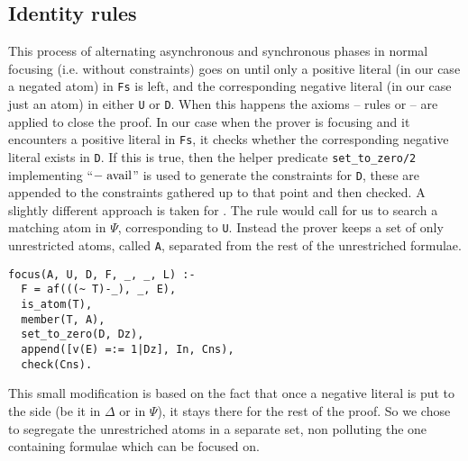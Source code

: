 \subsection{Identity rules}\label{sec:identity}
This process of alternating asynchronous and synchronous phases in normal focusing (i.e. without constraints) goes on until only a positive literal (in our case a negated atom) in \texttt{Fs} is left, and the corresponding negative literal (in our case just an atom) in either \texttt{U} or \texttt{D}.
When this happens the axioms -- rules \derRule[A]{\displayid[1]} or \derRule[A]{\displayid[2]} -- are applied to close the proof.
In our case when the prover is focusing and it encounters a positive literal in \texttt{Fs}, it checks whether the corresponding negative literal exists in \texttt{D}.
If this is true, then the helper predicate \texttt{set\_to\_zero/2} implementing ``$- \; \mathrm{avail}$'' is used to generate the constraints for \texttt{D}, these are appended to the constraints gathered up to that point and then checked.
A slightly different approach is taken for \derRule{\displayid[2]}.
The rule would call for us to search a matching atom in $\Psi$, corresponding to \texttt{U}.
Instead the prover keeps a set of only unrestricted atoms, called \texttt{A}, separated from the rest of the unrestriched formulae.
\begin{verbatim}
focus(A, U, D, F, _, _, L) :-
  F = af(((~ T)-_), _, E),
  is_atom(T),
  member(T, A),
  set_to_zero(D, Dz),
  append([v(E) =:= 1|Dz], In, Cns),
  check(Cns).
\end{verbatim}
This small modification is based on the fact that once a negative literal is put to the side (be it in $\Delta$ or in $\Psi$), it stays there for the rest of the proof.
So we chose to segregate the unrestriched atoms in a separate set, non polluting the one containing formulae which can be focused on.

